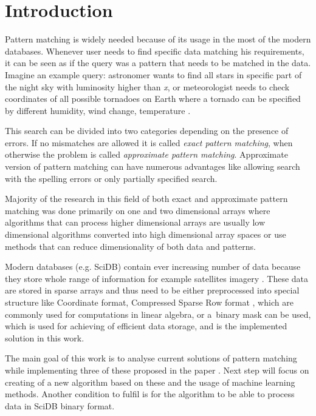 
\chapter{Introduction}
Pattern matching is widely needed because of its usage in the most of the modern databases. Whenever user needs to find specific data matching his requirements, it can be seen as if the query was a pattern that needs to be matched in the data. Imagine an example query: astronomer wants to find all stars in specific part of the night sky with luminosity higher than \textit{x}, or meteorologist needs to check coordinates of all possible tornadoes on Earth where a tornado can be specified by different humidity, wind change, temperature \cite{detectRivers}.

This search can be divided into two categories depending on the presence of errors. If no mismatches are allowed it is called \textit{exact pattern matching}, when otherwise the problem is called \textit{approximate pattern matching}. Approximate version of pattern matching can have numerous advantages like allowing search with the spelling errors or only partially specified search. 

Majority of the research in this field of both exact and approximate pattern matching was done primarily on one and two dimensional arrays where algorithms that can process higher dimensional arrays are usually low dimensional algorithms converted into high dimensional array spaces or use methods that can reduce dimensionality of both data and patterns.

Modern databases (e.g. SciDB) contain ever increasing number of data because they store whole range of information for example satellites imagery \cite{scidbarch}. These data are stored in sparse arrays and thus need to be either preprocessed into special structure like Coordinate format, Compressed Sparse Row format \cite{saad1990sparskit}, which are commonly used for computations in linear algebra, or a~binary mask can be used, which is used for achieving of efficient data storage, and is the implemented solution in this work.

The main goal of this work is to analyse current solutions of pattern matching while implementing three of these proposed in the paper \cite{mdApproxPM}. Next step will focus on creating of a new algorithm based on these and the usage of machine learning methods. Another condition to fulfil is for the algorithm to be able to process data in SciDB binary format. 


